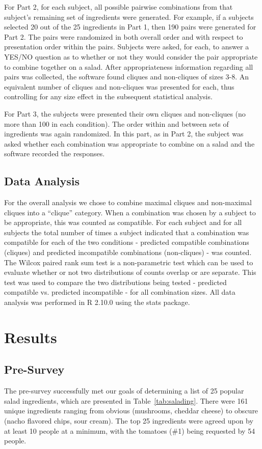For Part 2, for each subject, all possible pairwise combinations from that subject’s remaining set of ingredients were generated.  For example, if a subjects selected 20 out of the 25 ingredients in Part 1, then 190 pairs were generated for Part 2.  The pairs were randomized in both overall order and with respect to presentation order within the pairs.  Subjects were asked, for each, to answer a YES/NO question as to whether or not they would consider the pair appropriate to combine together on a salad.  After appropriateness information regarding all pairs was collected, the software found cliques and non-cliques of sizes 3-8.  An equivalent number of cliques and non-cliques was presented for each, thus controlling for any size effect in the subsequent statistical analysis.  

For Part 3, the subjects were presented their own cliques and non-cliques (no more than 100 in each condition).  The order within and between sets of ingredients was again randomized.  In this part, as in Part 2, the subject was asked whether each combination was appropriate to combine on a salad and the software recorded the responses.  

\subsection{Data Analysis}
For the overall analysis we chose to combine maximal cliques and non-maximal cliques into a “clique” category.  When a combination was chosen by a subject to be appropriate, this was counted as compatible.  For each subject and for all subjects the total number of times a subject indicated that a combination was compatible for each of the two conditions - predicted compatible combinations (cliques) and predicted incompatible combinations (non-cliques)  - was counted.  The Wilcox paired rank sum test is a non-parametric test which can be used to evaluate whether or not two distributions of counts overlap or are separate.  This test was used to compare the two distributions being tested - predicted compatible vs. predicted incompatible - for all combination sizes.  All data analysis was performed in R 2.10.0 using the stats package.  

\section{Results}
\subsection{Pre-Survey}
The pre-survey successfully met our goals of determining a list of 25 popular salad ingredients, which are presented in Table~\ref{tab:salading}.  There were 161 unique ingredients ranging from obvious (mushrooms, cheddar cheese) to obscure (nacho flavored chips, sour cream).  The top 25 ingredients were agreed upon by at least 10 people at a minimum, with the tomatoes (\#1) being requested by 54 people.  

